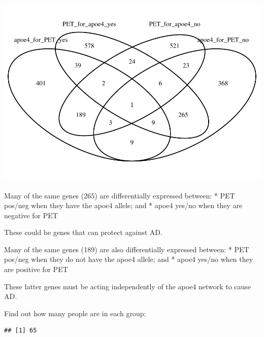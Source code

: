 \documentclass[]{article}
\newenvironment{Shaded}{\begin{snugshade}}{\end{snugshade}}
\newcommand{\KeywordTok}[1]{\textcolor[rgb]{0.13,0.29,0.53}{\textbf{#1}}}
\newcommand{\DecValTok}[1]{\textcolor[rgb]{0.00,0.00,0.81}{#1}}
\newcommand{\StringTok}[1]{\textcolor[rgb]{0.31,0.60,0.02}{#1}}
\newcommand{\OperatorTok}[1]{\textcolor[rgb]{0.81,0.36,0.00}{\textbf{#1}}}
\newcommand{\NormalTok}[1]{#1}
\begin{document}
\includegraphics{20180125_summary_to_date_files/figure-latex/unnamed-chunk-91-1.pdf}

Many of the same genes (265) are differentially expressed between: * PET
pos/neg when they have the apoe4 allele; and * apoe4 yes/no when they
are negative for PET

These could be genes that can protect against AD.

Many of the same genes (189) are also differentially expressed between:
* PET pos/neg when they do not have the apoe4 allele; and * apoe4 yes/no
when they are positive for PET

These latter genes must be acting independently of the apoe4 network to
cause AD.

Find out how many people are in each group:

\begin{Shaded}
\end{Shaded}

\begin{verbatim}
## [1] 65
\end{verbatim}

\begin{Shaded}
\end{Shaded}
\end{document}
